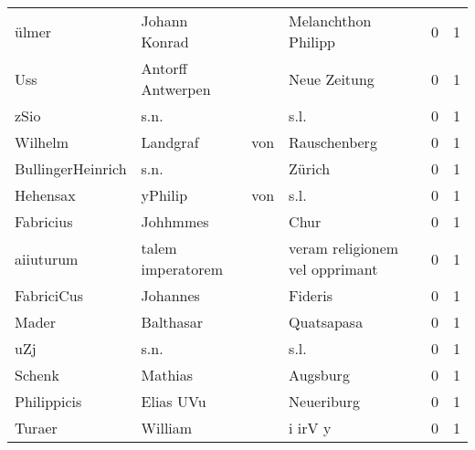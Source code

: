 \begin{tabular}{llllrr}
                    ülmer &                      Johann Konrad &             &                         Melanchthon Philipp &          0 &         1 \\
                      Uss &                  Antorff Antwerpen &             &                                Neue Zeitung &          0 &         1 \\
                     zSio &                               s.n. &             &                                        s.l. &          0 &         1 \\
                  Wilhelm &                           Landgraf &         von &                                Rauschenberg &          0 &         1 \\
        BullingerHeinrich &                               s.n. &             &                                      Zürich &          0 &         1 \\
                 Hehensax &                            yPhilip &         von &                                        s.l. &          0 &         1 \\
                Fabricius &                           Johhmmes &             &                                        Chur &          0 &         1 \\
                aiiuturum &                  talem imperatorem &             &              veram religionem vel opprimant &          0 &         1 \\
               FabriciCus &                           Johannes &             &                                     Fideris &          0 &         1 \\
                    Mader &                          Balthasar &             &                                  Quatsapasa &          0 &         1 \\
                      uZj &                               s.n. &             &                                        s.l. &          0 &         1 \\
                   Schenk &                            Mathias &             &                                    Augsburg &          0 &         1 \\
              Philippicis &                          Elias UVu &             &                                  Neueriburg &          0 &         1 \\
                   Turaer &                            William &             &                                     i irV y &          0 &         1 \\

\end{tabular}
